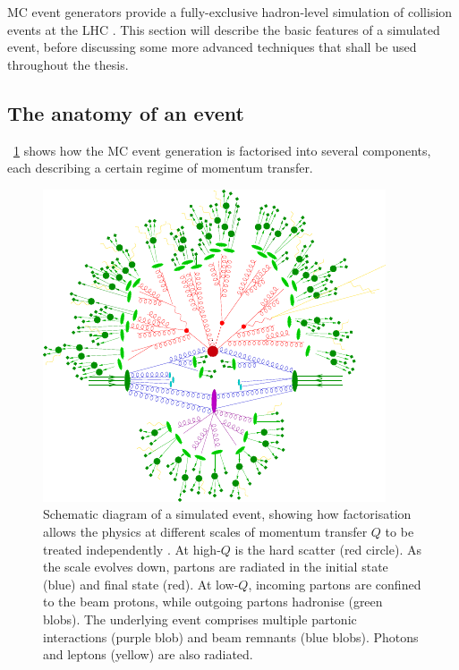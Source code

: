 
\ac{MC} event generators provide a fully-exclusive hadron-level simulation of \pp 
collision events at the \acs{LHC} \cite{MCnet:general}. This section will describe the 
basic features of a simulated event, before discussing some more advanced techniques 
that shall be used throughout the thesis.



\subsection{The anatomy of an event}

\Figure~\ref{fig:mcevent} shows how the \ac{MC} event generation is factorised into 
several components, each describing a certain regime of momentum transfer.

\begin{figure}[p]
	\includegraphics[width=\hugefigwidth]{tex/tools/event}
	\caption{Schematic diagram of a simulated \ttH event, showing how factorisation allows 
	the physics at different scales of momentum transfer $Q$ to be treated independently 
	\cite{MCnet:MatchingLectures}.
	At high-$Q$ is the hard scatter (red circle). As the scale evolves down, partons are 
	radiated in the initial state (blue) and final state (red). At low-$Q$, incoming 
	partons are confined to the beam protons, while outgoing partons hadronise (green 
	blobs). The underlying event comprises multiple partonic interactions (purple blob) 
	and beam remnants (blue blobs). Photons and leptons (yellow) are also radiated.}
	\label{fig:mcevent}
\end{figure}

